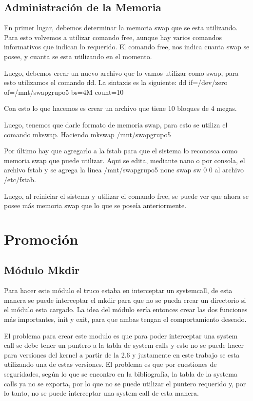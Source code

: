 \documentclass[a4paper, 12pt]{article}
\begin{document}
\subsection*{Administraci\'on de la Memoria}

En primer lugar, debemos determinar la memoria swap que se esta utilizando. Para esto volvemos a utilizar comando free, aunque hay varios comandos informativos que indican lo requerido. El comando free, nos indica cuanta swap se posee, y cuanta se esta utilizando en el momento.

Luego, debemos crear un nuevo archivo que lo vamos utilizar como swap, para esto utilizamos el comando dd. La sintaxis es la siguiente: dd if=/dev/zero of=/mnt/swapgrupo5 bs=4M count=10

Con esto lo que hacemos es crear un archivo que tiene 10 bloques de 4 megas. 

Luego, tenemos que darle formato de memoria swap, para esto se utiliza el comando mkswap. Haciendo mkswap /mnt/swapgrupo5


Por \'ultimo hay que agregarlo a la fstab para que el sistema lo reconosca como memoria swap que puede utilizar. Aqui se edita, mediante nano o por consola, el archivo fstab y se agrega la linea /mnt/swapgrupo5 none swap sw 0 0 al archivo /etc/fstab.


Luego, al reiniciar el sistema y utilizar el comando free, se puede ver que ahora se posee m\'as memoria swap que lo que se pose\'ia anteriormente. 



\section*{Promoci\'on}

\subsection*{M\'odulo Mkdir}

Para hacer este m\'odulo el truco estaba en interceptar un systemcall, de esta manera se puede interceptar el mkdir para que no se pueda crear un directorio si el m\'odulo esta cargado. La idea del m\'odulo ser\'ia entonces crear las dos funciones m\'as importantes, init y exit, para que ambas tengan el comportamiento deseado.

El problema para crear este modulo es que para poder interceptar una system call se debe tener un puntero a la tabla de system calls y esto no se puede hacer para versiones del kernel a partir de la 2.6 y justamente en este trabajo se esta utilizando una de estas versiones. El problema es que por cuestiones de seguridades, seg\'un lo que se encontro en la bibliograf\'ia, la tabla de la systema calls ya no se exporta, por lo que no se puede utilizar el puntero requerido y, por lo tanto, no se puede interceptar una system call de esta manera. 
\end{document}

